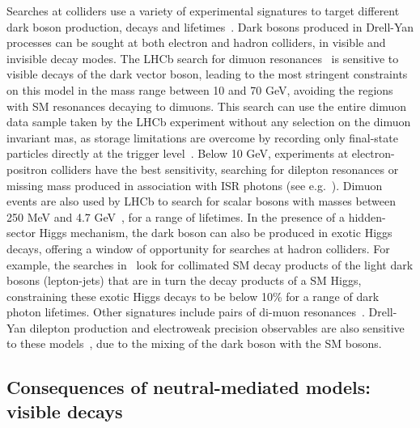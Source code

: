 Searches at colliders use a variety of experimental signatures to target different dark boson production, decays and lifetimes~\cite{Curtin:2014cca}. 
Dark bosons produced in Drell-Yan processes can be sought at both electron and hadron colliders, in visible and invisible decay modes. 
The LHCb search for dimuon resonances~\cite{Aaij:2017rft} is sensitive to visible decays of the dark vector boson, leading to the most stringent constraints on this model in the mass range between 10 and 70 GeV, avoiding the regions with SM resonances decaying to dimuons. 
This search can use the entire dimuon data sample taken by the LHCb experiment without any selection on the dimuon invariant mas, as storage limitations are overcome by recording only final-state particles directly at the trigger level~\cite{Aaij:2016rxn}. 
Below 10 GeV, experiments at electron-positron colliders have the best sensitivity, searching for dilepton resonances or missing mass produced in association with ISR photons (see e.g.~\cite{Lees:2014xha,Lees:2017lec}). %
Dimuon events are also used by LHCb to search for scalar bosons with masses between 250 MeV and 4.7 GeV~\cite{Aaij:2016qsm}, for a range of lifetimes. 
In the presence of a hidden-sector Higgs mechanism, the dark boson can also be produced in exotic Higgs decays, offering a window of opportunity %
for searches at hadron colliders. 
For example, the searches in~\cite{ATLAS:2016jza,CMS-PAS-HIG-16-035} look for collimated SM decay products of the light dark bosons (lepton-jets) that are in turn the decay products of a SM Higgs, constraining these exotic Higgs decays to be below 10\% for a range of dark photon lifetimes. 
Other signatures include pairs of di-muon resonances~\cite{Aad:2015sva,CMS-PAS-HIG-16-035}.
Drell-Yan dilepton production and electroweak precision observables are also sensitive to these models~\cite{Curtin:2014cca}, due to the mixing of the dark boson with the SM bosons. 

\subsection{Consequences of neutral-mediated models: visible decays}
\label{sec:MediatorSearches}
\label{sub:twoBody}


